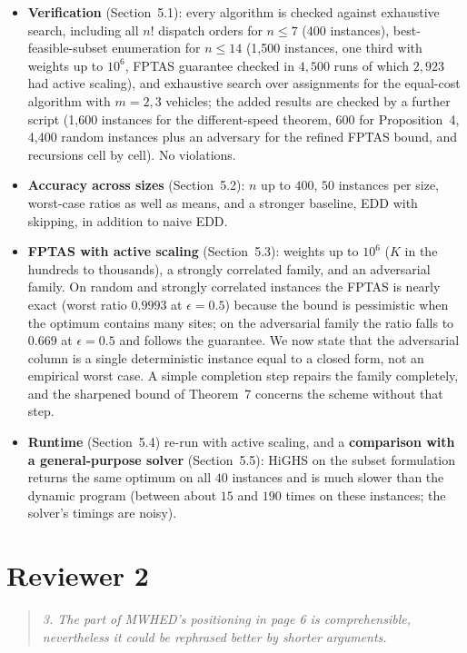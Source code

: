 \documentclass[11pt]{article}
\newenvironment{comment}{\par\medskip\begin{quote}\small\itshape}{\end{quote}}
\begin{document}
\begin{itemize}[leftmargin=*,itemsep=2pt]
\item \textbf{Verification} (Section~5.1): every algorithm is checked
against exhaustive search, including all $n!$ dispatch orders for
$n\le7$ (400 instances), best-feasible-subset enumeration for $n\le14$
(1,500 instances, one third with weights up to $10^6$, FPTAS guarantee
checked in $4{,}500$ runs of which $2{,}923$ had active scaling), and
exhaustive search over assignments for the equal-cost algorithm with
$m=2,3$ vehicles; the added results are checked by a further script
(1,600 instances for the different-speed theorem, 600 for
Proposition~4, 4,400 random instances plus an adversary for the refined
FPTAS bound, and recursions cell by cell). No violations.
\item \textbf{Accuracy across sizes} (Section~5.2): $n$ up to $400$, $50$
instances per size, worst-case ratios as well as means, and a stronger
baseline, EDD with skipping, in addition to naive EDD.
\item \textbf{FPTAS with active scaling} (Section~5.3): weights up to
$10^6$ ($K$ in the hundreds to thousands), a strongly correlated family,
and an adversarial family. On random and strongly correlated instances
the FPTAS is nearly exact (worst ratio $0.9993$ at $\epsilon=0.5$)
because the bound is pessimistic when the optimum contains many sites; on
the adversarial family the ratio falls to $0.669$ at $\epsilon=0.5$ and
follows the guarantee. We now state that the adversarial column is a
single deterministic instance equal to a closed form, not an empirical
worst case. A simple completion step repairs the family completely, and
the sharpened bound of Theorem~7 concerns the scheme without that step.
\item \textbf{Runtime} (Section~5.4) re-run with active scaling, and a
\textbf{comparison with a general-purpose solver} (Section~5.5): HiGHS on
the subset formulation returns the same optimum on all $40$ instances and
is much slower than the dynamic program (between about $15$ and $190$ times
on these instances; the solver's timings are noisy).
\end{itemize}

\section{Reviewer 2}

\begin{comment}
3. The part of MWHED's positioning in page 6 is comprehensible,
nevertheless it could be rephrased better by shorter arguments.
\end{comment}
\end{document}
